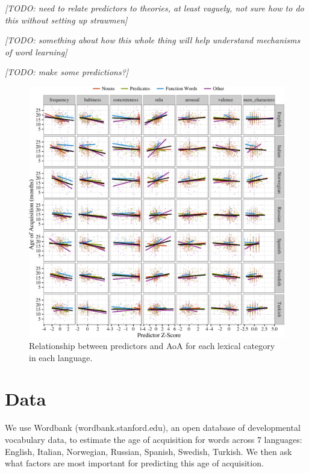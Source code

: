 \documentclass[10pt, letterpaper]{article}
\newenvironment{CodeChunk}{}{}
\begin{document}
\emph{{[}TODO: need to relate predictors to theories, at least vaguely,
not sure how to do this without setting up strawmen{]}}

\emph{{[}TODO: something about how this whole thing will help understand
mechanisms of word learning{]}}

\emph{{[}TODO: make some predictions?{]}}

\begin{CodeChunk}
\begin{figure}[!h]

{\centering \includegraphics{figs/data-1} 

}

\caption[Relationship between predictors and AoA for each lexical category in each language]{Relationship between predictors and AoA for each lexical category in each language.}\label{fig:data}
\end{figure}
\end{CodeChunk}

\section{Data}\label{data}

We use Wordbank (wordbank.stanford.edu), an open database of
developmental vocabulary data, to estimate the age of acquisition for
words across 7 languages: English, Italian, Norwegian, Russian, Spanish,
Swedish, Turkish. We then ask what factors are most important for
predicting this age of acquisition.
\end{document}
